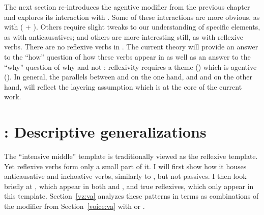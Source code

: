 \begin{exe}
\begin{xlist}
\begin{xlist}
\begin{exe}
\begin{xlist}
\begin{xlist}
\begin{exe}
\begin{xlist}
\begin{xlist}
\begin{exe}
\begin{exe}
\begin{xlist}
\begin{exe}
\begin{exe}
\begin{xlist}
\begin{exe}
\begin{exe}
\begin{exe}
\begin{exe}
\begin{exe}
\begin{xlist}
\begin{exe}
\begin{xlist}
\begin{exe}
\begin{exe}
\begin{xlist}
\begin{exe}
\begin{xlist}
\begin{exe}
\begin{xlist}
\begin{exe}
\begin{exe}
\begin{exe}
\begin{xlist}
\begin{exe}
\begin{exe}
\begin{exe}
\begin{xlist}
\begin{exe}
\begin{xlist}
\begin{exe}
\begin{xlist}
\begin{exe}
\begin{xlist}
\begin{exe}
\begin{exe}
\begin{exe}
\begin{exe}
\begin{xlist}
\begin{exe}
\begin{xlist}
\begin{exe}
\begin{xlist}
\begin{exe}
\begin{xlist}
\begin{exe}
\begin{xlist}
\begin{exe}
\begin{xlist}
\begin{exe}
\begin{exe}
\begin{exe}
\begin{exe}
\begin{xlist}
\begin{exe}
\begin{xlist}
\begin{exe}
\begin{xlist}
\begin{exe}
\begin{exe}
\begin{xlist}
The next section re-introduces the agentive modifier {\va} from the previous chapter and explores its interaction with {\vz}. Some of these interactions are more obvious, as with  ({\va} + {\pz}). Others require slight tweaks to our understanding of specific elements, as with anticausatives; and others are more interesting still, as with reflexive verbs. There are no reflexive verbs in {\tnif}. The current theory will provide an answer to the ``how'' question of how these verbs appear in {\thit} as well as an answer to the ``why'' question of why {\thit} and not {\tnif}: reflexivity requires a theme (\vz) which is agentive (\va). In general, the parallels between {\tkal} and {\thif} on the one hand, and {\tpie} and {\thit} on the other hand, will reflect the layering assumption which is at the core of the current work. 


\section{\thit: Descriptive generalizations} \label{vz:thit}
The ``intensive middle'' template {\thit} is traditionally viewed as the reflexive template. Yet reflexive verbs form only a small part of it. I will first show how it houses anticausative and inchoative verbs, similarly to {\tnif}, but not passives. I then look briefly at , which appear in both {\tnif} and {\thit}, and true reflexives, which only appear in this template. Section~\ref{vz:va} analyzes these patterns in terms as combinations of the modifier {\va} from Section~\ref{voice:va} with {\vz} or {\pz}.


\end{xlist}
\end{exe}
\end{exe}
\end{xlist}
\end{exe}
\end{xlist}
\end{exe}
\end{xlist}
\end{exe}
\end{exe}
\end{exe}
\end{exe}
\end{xlist}
\end{exe}
\end{xlist}
\end{exe}
\end{xlist}
\end{exe}
\end{xlist}
\end{exe}
\end{xlist}
\end{exe}
\end{xlist}
\end{exe}
\end{exe}
\end{exe}
\end{exe}
\end{xlist}
\end{exe}
\end{xlist}
\end{exe}
\end{xlist}
\end{exe}
\end{xlist}
\end{exe}
\end{exe}
\end{exe}
\end{xlist}
\end{exe}
\end{exe}
\end{exe}
\end{xlist}
\end{exe}
\end{xlist}
\end{exe}
\end{xlist}
\end{exe}
\end{exe}
\end{xlist}
\end{exe}
\end{xlist}
\end{exe}
\end{exe}
\end{exe}
\end{exe}
\end{exe}
\end{xlist}
\end{exe}
\end{exe}
\end{xlist}
\end{exe}
\end{exe}
\end{xlist}
\end{xlist}
\end{exe}
\end{xlist}
\end{xlist}
\end{exe}
\end{xlist}
\end{xlist}
\end{exe}
